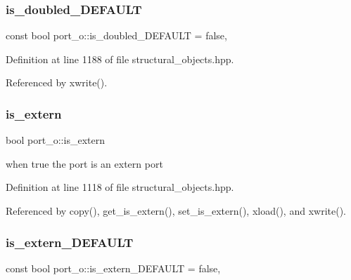 \subsubsection{\texorpdfstring{is\+\_\+doubled\+\_\+\+D\+E\+F\+A\+U\+LT}{is\_doubled\_DEFAULT}}
{\footnotesize\ttfamily const bool port\+\_\+o\+::is\+\_\+doubled\+\_\+\+D\+E\+F\+A\+U\+LT = false\hspace{0.3cm}{\ttfamily [static]}, {\ttfamily [private]}}



Definition at line 1188 of file structural\+\_\+objects.\+hpp.



Referenced by xwrite().

\mbox{\label{structport__o_ae21eed41bc107bc6ffffd3eca1666127}} 
\subsubsection{\texorpdfstring{is\+\_\+extern}{is\_extern}}
{\footnotesize\ttfamily bool port\+\_\+o\+::is\+\_\+extern\hspace{0.3cm}{\ttfamily [private]}}



when true the port is an extern port 



Definition at line 1118 of file structural\+\_\+objects.\+hpp.



Referenced by copy(), get\+\_\+is\+\_\+extern(), set\+\_\+is\+\_\+extern(), xload(), and xwrite().

\mbox{\label{structport__o_a853847e2869d2d24e6649adec8501dc3}} 
\subsubsection{\texorpdfstring{is\+\_\+extern\+\_\+\+D\+E\+F\+A\+U\+LT}{is\_extern\_DEFAULT}}
{\footnotesize\ttfamily const bool port\+\_\+o\+::is\+\_\+extern\+\_\+\+D\+E\+F\+A\+U\+LT = false\hspace{0.3cm}{\ttfamily [static]}, {\ttfamily [private]}}



